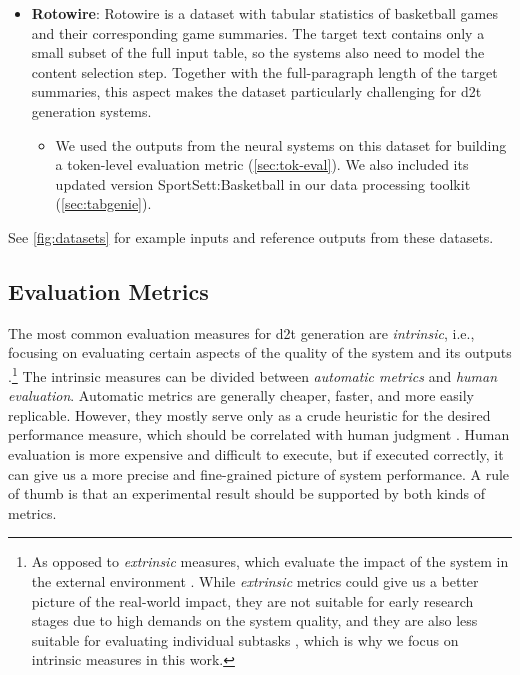{\begin{itemize}
    \item \textbf{Rotowire}: Rotowire \cite{wiseman2017challenges} is a dataset with tabular statistics of basketball games and their corresponding game summaries. The target text contains only a small subset of the full input table, so the systems also need to model the content selection step. Together with the full-paragraph length of the target summaries, this aspect makes the dataset particularly challenging for \ac{d2t} generation systems.
          \begin{itemize}
              \item
                    We used the outputs from the neural systems on this dataset for building a token-level evaluation metric (\autoref{sec:tok-eval}). We also included its updated version SportSett:Basketball \cite{thomson2020sportsett} in our data processing toolkit (\autoref{sec:tabgenie}).
          \end{itemize}
\end{itemize}

See \autoref{fig:datasets} for example inputs and reference outputs from these datasets.

\subsection{Evaluation Metrics}
\label{sec:evaluation}

The most common evaluation measures for \ac{d2t} generation are \emph{intrinsic}, i.e., focusing on evaluating certain aspects of the quality of the system and its outputs \cite{gkatzia2015snapshot,celikyilmazEvaluationTextGeneration2021}.\footnote{As opposed to \emph{extrinsic} measures, which evaluate the impact of the system in the external environment \cite{celikyilmazEvaluationTextGeneration2021}. While \emph{extrinsic} metrics could give us a better picture of the real-world impact, they are not suitable for early research stages due to high demands on the system quality, and they are also less suitable for evaluating individual subtasks \cite{van2019best}, which is why we focus on intrinsic measures in this work.} The intrinsic measures can be divided between \emph{automatic metrics} and \emph{human evaluation}. Automatic metrics are generally cheaper, faster, and more easily replicable. However, they mostly serve only as a crude heuristic for the desired performance measure, which should be correlated with human judgment \cite{van2019best}. Human evaluation is more expensive and difficult to execute, but if executed correctly, it can give us a more precise and fine-grained picture of system performance. A rule of thumb is that an experimental result should be supported by both kinds of metrics.


}
